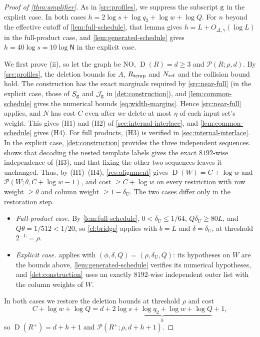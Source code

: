 \documentclass[11pt,letterpaper]{article} \usepackage[utf8]{inputenc}
\theoremstyle{plain} \newtheorem{theorem}{Theorem}[section]
\theoremstyle{definition} \newaliascnt{definition}{theorem}
\newcommand{\D}{\operatorname{D}}
\newcommand{\RP}[3]{\mathcal{P}(#1;#2,#3)}
\begin{document}
\begin{proof}[Proof of \cref{thm:amplifier}]
\label{proof:thm:amplifier}
As in \cref{src:profiles}, we suppress the subscript $\rm g$ in the explicit
case. In both cases $h=2\log s+\log q_2+\log w+\log Q$. For $n$ beyond the
effective cutoff of \cref{lem:full-schedule}, that lemma gives $h=L+O_{\Delta,\gamma}(\log L)$ in the
full-product case, and \cref{lem:generated-schedule} gives
$h=40\log s=10\log\mathsf N$ in the explicit case.

We first prove (ii), so let the graph be NO, $\D(R)=d\ge3$ and
$\RP{R}{\rho}{d}$. By \cref{src:profiles}, the deletion bounds for $A$,
$R_{\rm temp}$ and $N_{\rm ref}$ and the collision bound hold. The construction has
the exact marginals required by \cref{src:near-full} (in the explicit case,
those of $S_{\rm g}$ and $\mathcal J_{\rm g}$ in \cref{det:construction}), and
\cref{lem:common-schedule} gives the numerical bounds \eqref{eq:width-margins}.
Hence \cref{src:near-full} applies, and $N$ has cost $C$ even after we delete at most
$\eta$ of each input set's weight. This gives (H1) and (H2) of
\cref{sec:internal-interlace}, and \cref{lem:common-schedule} gives (H4). For full
products, (H3) is verified in \cref{sec:internal-interlace}. In the
explicit case, \cref{det:construction} provides the three independent
sequences.  shows that decoding the nested template labels gives
the exact $8192$-wise independence of (H3), and that fixing the other two
sequences leaves it unchanged.
Thus, by (H1)--(H4), \cref{res:alignment} gives $\D(W)=C+\log w$ and
$\RP{W}{\theta}{C+\log w-1}$, and cost $\ge C+\log w$ on every restriction
with row weight $\ge\theta$ and column weight $\ge1-\delta_U$.
The two cases differ only in the restoration step.
\begin{itemize}
\item \emph{Full-product case.} By \cref{lem:full-schedule},
\(0<\delta_U\le1/64\), \(Q\delta_U\ge80L\), and \(Q\theta=1/512<1/20\), so
\cref{cl:bridge} applies with \(b=L\) and \(\delta=\delta_U\), at threshold
$2^{-L}=\rho$.
\item \emph{Explicit case.}  applies with
$(\phi,\delta,Q)=(\rho,\delta_U,Q)$: its hypotheses on $W$ are the bounds above,
\cref{lem:generated-schedule} verifies its numerical hypotheses, and
\cref{det:construction} uses an exactly $8192$-wise independent outer list with the
column weights of $W$.
\end{itemize}
In both cases we restore the deletion bounds at threshold $\rho$ and cost
\[
C+\log w+\log Q
=d+\underbrace{2\log s+\log q_2+\log w+\log Q}_{h}+1,
\]
so $\D(R^+)=d+h+1$ and $\RP{R^+}{\rho}{d+h+1}$.


\end{proof}
\end{document}
